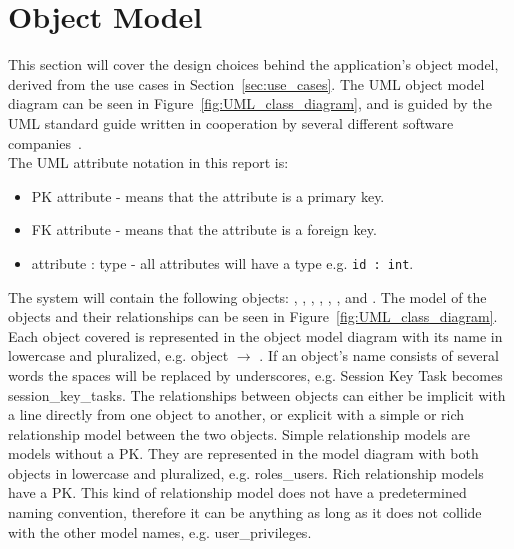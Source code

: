\section{Object Model}
\label{section:uml_notation}
\label{subsec:objects}

This section will cover the design choices behind the application's object model, derived from the use cases in Section~\ref{sec:use_cases}.
The UML object model diagram can be seen in Figure~\ref{fig:UML_class_diagram}, and is guided by the UML standard guide written in cooperation by several different software companies~\citep{UML_notation}.\\

The UML attribute notation in this report is:
\begin{itemize}
    \item PK attribute - means that the attribute is a primary key.
    \item FK attribute - means that the attribute is a foreign key.
    \item attribute : type - all attributes will have a type e.g. \verb+id : int+.
\end{itemize}

The system will contain the following objects: , , , , , , and .
The model of the objects and their relationships can be seen in Figure~\ref{fig:UML_class_diagram}.
Each object covered is represented in the object model diagram with its name in lowercase and pluralized, e.g.  object $\rightarrow$ .
If an object's name consists of several words the spaces will be replaced by underscores, e.g. Session Key Task becomes session\_key\_tasks.
The relationships between objects can either be implicit with a line directly from one object to another, or explicit with a simple or rich relationship model between the two objects.
Simple relationship models are models without a PK. They are represented in the model diagram with both objects in lowercase and pluralized, e.g. roles\_users.
Rich relationship models have a PK. This kind of relationship model does not have a predetermined naming convention, therefore it can be anything as long as it does not collide with the other model names, e.g. user\_privileges.\\

